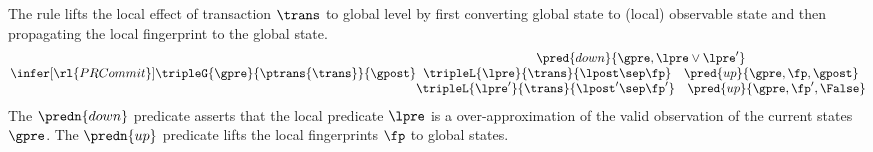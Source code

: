 The  rule lifts the local effect of transaction \( \trans \) to global level by first converting global state to (local) observable state and then propagating the local fingerprint to the global state.
\[
    \infer[\rl{PRCommit}]{%
        \tripleG{\gpre}{ \ptrans{\trans} }{\gpost}
    }{%
        \begin{array}{@{}c@{}}
        \pred{down}{\gpre, \lpre \lor \lpre'} \\
        \tripleL{\lpre}{\trans}{\lpost \sep \fp}
        \quad \pred{up}{\gpre,\fp,\gpost} \\
        \tripleL{\lpre'}{\trans}{\lpost' \sep \fp'}
        \quad \pred{up}{\gpre,\fp',\False}
        \end{array}
    }
\]
The \( \predn{down} \) predicate asserts that the local predicate \( \lpre \) is a over-approximation of the valid observation of the current states \( \gpre \).
The \( \predn{up} \) predicate lifts the local fingerprints \( \fp \) to global states.
